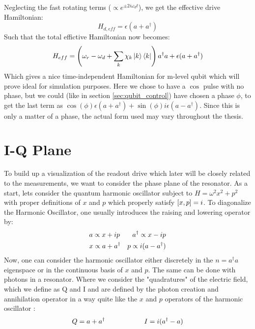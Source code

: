Neglecting the fast rotating terms ($\propto e^{\pm 2i\omega_dt}$), we get the effective drive Hamiltonian:
\begin{equation}
    H_{d, eff} = \epsilon(a + a^\dagger)
\end{equation}
Such that the total effictive Hamiltonian now becomes:
\begin{equation}
    H_{eff} =  \left(\omega_r - \omega_d + \sum_k \chi_k \ket{k}\bra{k}\right)a^\dagger a + \epsilon(a + a^\dagger)
\end{equation}
Which gives a nice time-independent Hamiltonian for m-level qubit which will prove ideal for simulation purposes. Here we chose to have a $\cos$ pulse with no phase, but we could (like in section \ref{sec:qubit_control}) have chosen a phase $\phi$, to get the last term as $\cos(\phi)\epsilon(a + a^\dagger) + \sin(\phi)i\epsilon(a - a^\dagger)$. Since this is only a matter of a phase, the actual form used may vary throughout the thesis. 



\section{I-Q Plane}
To build up a visualization of the readout drive which later will be closely related to the measurements, we want to consider the phase plane of the resonator. As a start, lets consider the quantum harmonic oscillator subject to $H = \omega^2  x^2 + p^2$ with proper definitions of $x$ and $p$ which properly satisfy $\comm{x}{p} = i$. To diagonalize the Harmonic Oscillator, one usually introduces the raising and lowering operator by:
\begin{align}
    &a \propto x + ip \hfill &a^\dagger \propto x - ip \\
    &x \propto a + a^\dagger \hfill &p\propto i (a - a^\dagger)
\end{align}
Now, one can consider the harmonic oscillator either discretely in the $n = a^\dagger a$ eigenspace or in the continuous basis of $x$ and $p$. The same can be done with photons in a resonator. Where we consider the "quadratures" of the electric field, which we define as Q and I and are defined by the photon creation and annihilation operator in a way quite like the $x$ and $p$ operators of the harmonic oscillator \cite{knight}:
\begin{equation}
    Q = a + a^\dagger \hspace{2 cm} I = i(a^\dagger - a)
\end{equation}

